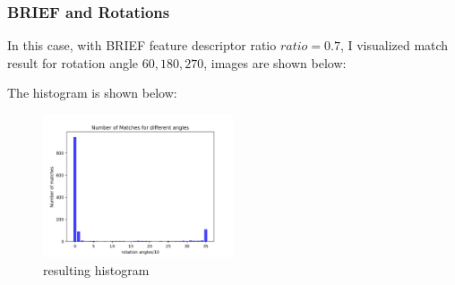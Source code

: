 \documentclass[11pt]{article} \usepackage{fullpage} \usepackage{graphicx} \usepackage{epstopdf} \usepackage{color} \usepackage{psfrag} \usepackage{pdfsync}\usepackage{indentfirst}\usepackage{subfigure}\usepackage{float}\usepackage[section]{placeins}
\begin{document}
\subsubsection{BRIEF and Rotations}

In this case, with BRIEF feature descriptor ratio $ratio = 0.7$, I visualized match result for rotation angle $60, 180, 270$, images are shown below:
\begin{figure}[H]
\centering
{}
\end{figure}

The histogram is shown below:
\begin{figure}[H]
\centering
\includegraphics[width=0.5\textwidth]{results/q2_1_6_his.png}
\caption{resulting histogram}
\end{figure}
\end{document}
